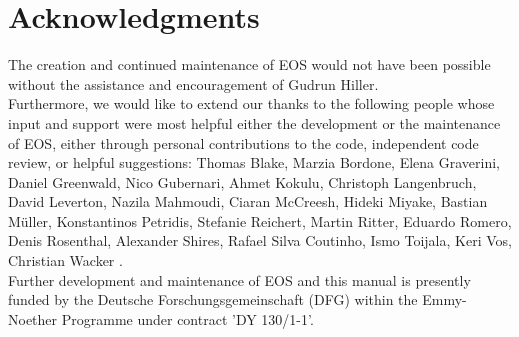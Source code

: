 \chapter{Acknowledgments}

The creation and continued maintenance of EOS would not have been possible without
the assistance and encouragement of Gudrun Hiller.\\

Furthermore, we would like to extend our thanks to the following people
whose input and support were most helpful either the development or the
maintenance of EOS, either through personal contributions to the code,
independent code review, or helpful suggestions:
Thomas Blake,
Marzia Bordone,
Elena Graverini,
Daniel Greenwald,
Nico Gubernari,
Ahmet Kokulu,
Christoph Langenbruch,
David Leverton,
Nazila Mahmoudi,
Ciaran McCreesh,
Hideki Miyake,
Bastian Müller,
Konstantinos Petridis,
Stefanie Reichert,
Martin Ritter,
Eduardo Romero,
Denis Rosenthal,
Alexander Shires,
Rafael Silva Coutinho,
Ismo Toijala,
Keri Vos,
Christian Wacker
.\\

Further development and maintenance of EOS and this manual is presently funded by the
Deutsche Forschungsgemeinschaft (DFG) within the Emmy-Noether Programme under contract
'DY 130/1-1'.

